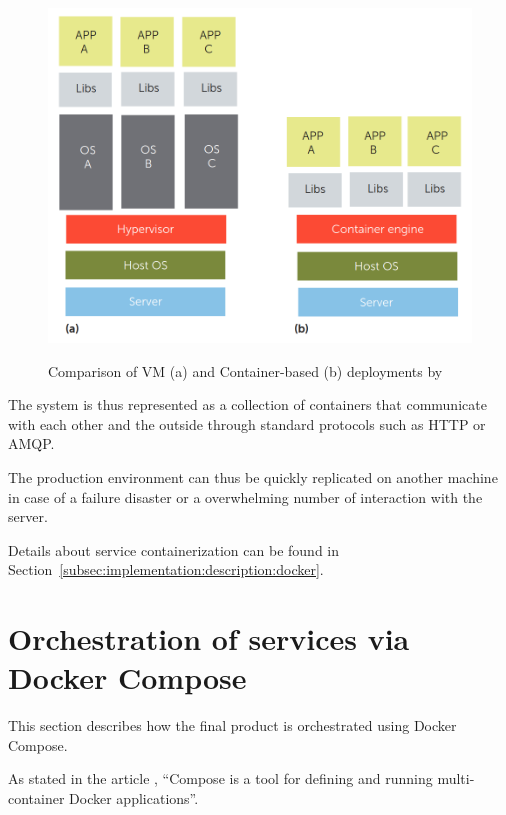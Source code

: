 \begin{figure}[H]
    \centering
    \resizebox{0.7\columnwidth}{!}
    {
       \includegraphics{assets/figures/vmvscontainer.png}
    }
    \caption[Comparison of VM and Container-based deployments]{Comparison of VM (a) and Container-based (b) deployments by \cite{bernstein2014containers}}
    \label{fig:implementation:decisions:docker:contvsvm}
\end{figure}

The system is thus represented as a collection of containers that communicate with each other and the outside through standard protocols such as HTTP or \gls{AMQP}.

The production environment can thus be quickly replicated on another machine in case of a failure disaster or a overwhelming number of interaction with the server.

Details about service containerization can be found in Section~\ref{subsec:implementation:description:docker}.

\section{Orchestration of services via Docker Compose}
\label{subsec:implementation:decisions:compose}

This section describes how the final product is orchestrated using Docker Compose.

As stated in the article , ``Compose is a tool for defining and running multi-container Docker applications''.

